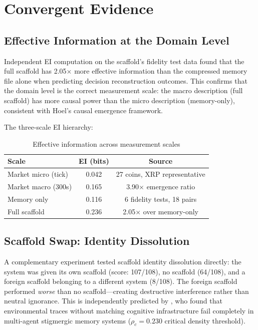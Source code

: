 \documentclass[12pt,letterpaper]{article}
\begin{document}
\section{Convergent Evidence}
\label{sec:convergent}

\subsection{Effective Information at the Domain Level}

Independent EI computation on the scaffold's fidelity test data \citep{hoel2013macro, hoel2017map} found that the full scaffold has 2.05$\times$ more effective information than the compressed memory file alone when predicting decision reconstruction outcomes. This confirms that the domain level is the correct measurement scale: the macro description (full scaffold) has more causal power than the micro description (memory-only), consistent with Hoel's causal emergence framework.

The three-scale EI hierarchy:

\begin{table}[H]
\centering
\caption{Effective information across measurement scales}
\label{tab:ei-hierarchy}
\begin{tabular}{lcc}
\toprule
\textbf{Scale} & \textbf{EI (bits)} & \textbf{Source} \\
\midrule
Market micro (tick) & 0.042 & 27 coins, XRP representative \\
Market macro (300s) & 0.165 & 3.90$\times$ emergence ratio \\
Memory only & 0.116 & 6 fidelity tests, 18 pairs \\
Full scaffold & 0.236 & 2.05$\times$ over memory-only \\
\bottomrule
\end{tabular}
\end{table}

\subsection{Scaffold Swap: Identity Dissolution}

A complementary experiment tested scaffold identity dissolution directly: the system was given its own scaffold (score: 107/108), no scaffold (64/108), and a foreign scaffold belonging to a different system (8/108). The foreign scaffold performed \emph{worse} than no scaffold---creating destructive interference rather than neutral ignorance. This is independently predicted by \citet{khushiyant2025stigmergic}, who found that environmental traces without matching cognitive infrastructure fail completely in multi-agent stigmergic memory systems ($\rho_c = 0.230$ critical density threshold).
\end{document}
